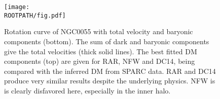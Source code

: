 \begin{figure}%
	\centering%
	\texttt{[image: \\ROOTPATH/fig.pdf]}
	\caption{Rotation curve of NGC0055 with total velocity and baryonic components (bottom). The sum of dark and baryonic components give the total velocities (thick solid lines). The best fitted DM components (top) are given for RAR, NFW and DC14, being compared with the inferred DM from SPARC data. RAR and DC14 produce very similar results despite the underlying physics. NFW is is clearly disfavored here, especially in the inner halo.}%
\label{fig:RC:NGC0055}
\end{figure}